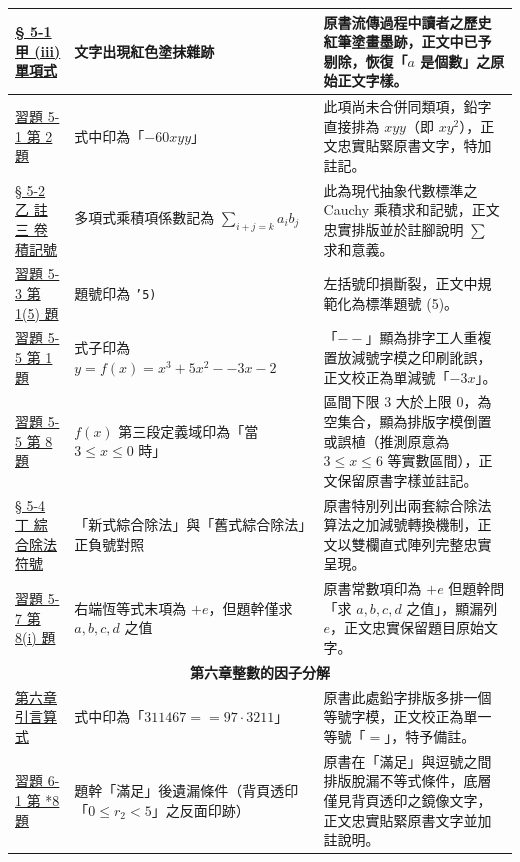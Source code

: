 \documentclass[a4paper,12pt,twoside]{article}
\begin{document}
\begin{table}[H]
\begin{tabularx}{\textwidth}{|p{3.0cm}|p{3.8cm}|X|}
\hyperref[subsec:5-1-a]{§ 5-1 甲 (iii) 單項式} & 
文字出現紅色塗抹雜跡 & 
原書流傳過程中讀者之歷史紅筆塗畫墨跡，正文中已予剔除，恢復「$a$ 是個數」之原始正文字樣。 \\ \hline

\hyperref[sec:ex5-1]{習題 5-1 第 2 題} & 
式中印為「$-60xyy$」 & 
此項尚未合併同類項，鉛字直接排為 $xyy$（即 $xy^2$），正文忠實貼緊原書文字，特加註記。 \\ \hline

\hyperref[subsec:5-2-b]{§ 5-2 乙 註三 卷積記號} & 
多項式乘積項係數記為 $\sum_{i+j=k} a_i b_j$ & 
此為現代抽象代數標準之 Cauchy 乘積求和記號，正文忠實排版並於註腳說明 $\sum$ 求和意義。 \\ \hline

\hyperref[item:ex5-3-1-5]{習題 5-3 第 1(5) 題} & 
題號印為 \texttt{'5)} & 
左括號印損斷裂，正文中規範化為標準題號 (5)。 \\ \hline

\hyperref[item:ex5-5-1]{習題 5-5 第 1 題} & 
式子印為 $y=f(x)=x^3+5x^2--3x-2$ & 
「$--$」顯為排字工人重複置放減號字模之印刷訛誤，正文校正為單減號「$-3x$」。 \\ \hline

\hyperref[item:ex5-5-8]{習題 5-5 第 8 題} & 
$f(x)$ 第三段定義域印為「當 $3 \le x \le 0$ 時」 & 
區間下限 3 大於上限 0，為空集合，顯為排版字模倒置或誤植（推測原意為 $3 \le x \le 6$ 等實數區間），正文保留原書字樣並註記。 \\ \hline

\hyperref[subsec:5-4-d]{§ 5-4 丁 綜合除法符號} & 
「新式綜合除法」與「舊式綜合除法」正負號對照 & 
原書特別列出兩套綜合除法算法之加減號轉換機制，正文以雙欄直式陣列完整忠實呈現。 \\ \hline

\hyperref[sec:ex5-7]{習題 5-7 第 8(i) 題} & 
右端恆等式末項為 $+e$，但題幹僅求 $a,b,c,d$ 之值 & 
原書常數項印為 $+e$ 但題幹問「求 $a,b,c,d$ 之值」，顯漏列 $e$，正文忠實保留題目原始文字。 \\ \hline

\multicolumn{3}{|c|}{\textbf{第六章\quad 整數的因子分解}} \\ \hline

\hyperref[note:ch6-double-equal]{第六章 引言算式} & 
式中印為「$311467==97 \cdot 3211$」 & 
原書此處鉛字排版多排一個等號字模，正文校正為單一等號「$=$」，特予備註。 \\ \hline

\hyperref[item:ex6-1-8]{習題 6-1 第 *8 題} & 
題幹「滿足」後遺漏條件（背頁透印「$0 \le r_2 < 5$」之反面印跡） & 
原書在「滿足」與逗號之間排版脫漏不等式條件，底層僅見背頁透印之鏡像文字，正文忠實貼緊原書文字並加註說明。 \\ \hline


\end{tabularx}
\end{table}
\end{document}
